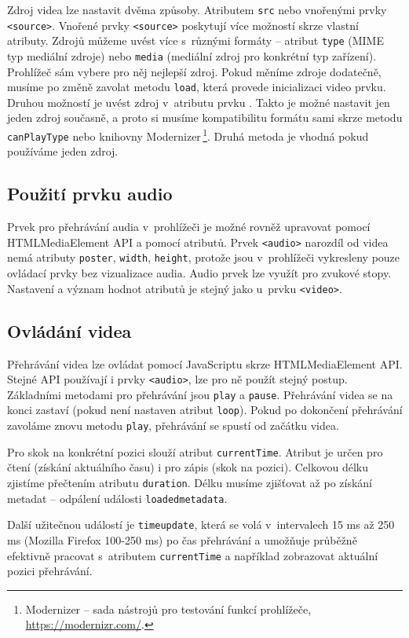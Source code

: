 Zdroj videa lze nastavit dvěma způsoby. Atributem \texttt{src} nebo vnořenými prvky \texttt{<source>}. Vnořené prvky \texttt{<source>} poskytují více možností skrze vlastní atributy. Zdrojů můžeme uvést více s~různými formáty -- atribut \texttt{type} (MIME typ mediální zdroje) nebo \texttt{media} (mediální zdroj pro konkrétní typ zařízení). Prohlížeč sám vybere pro něj nejlepší zdroj. Pokud měníme zdroje dodatečně, musíme po změně zavolat metodu \texttt{load}, která provede inicializaci video prvku. Druhou možností je uvést zdroj v~atributu  prvku . Takto je možné nastavit jen jeden zdroj současně, a proto si musíme kompatibilitu formátu sami skrze metodu \texttt{canPlayType} nebo knihovny Modernizer\,\footnote{Modernizer -- sada nástrojů pro testování funkcí prohlížeče, \url{https://modernizr.com/}.}. Druhá metoda je vhodná pokud používáme jeden zdroj.

\subsection{Použití prvku audio}
Prvek pro přehrávání audia v~prohlížeči je možné rovněž upravovat pomocí HTMLMediaElement API a pomocí atributů. Prvek \texttt{<audio>} narozdíl od videa nemá atributy \texttt{poster}, \texttt{width}, \texttt{height}, protože jsou v~prohlížeči vykresleny pouze ovládací prvky bez vizualizace audia. Audio prvek lze využít pro zvukové stopy. Nastavení a význam hodnot atributů je stejný jako u~prvku \texttt{<video>}.

\subsection{Ovládání videa}
Přehrávání videa lze ovládat pomocí JavaScriptu skrze HTMLMediaElement API. Stejné API používají i prvky \texttt{<audio>}, lze pro ně použít stejný postup. Základními metodami pro přehrávání jsou \texttt{play} a \texttt{pause}. Přehrávání videa se na konci zastaví (pokud není nastaven atribut \texttt{loop}). Pokud po dokončení přehrávání zavoláme znovu metodu \texttt{play}, přehrávání se spustí od začátku videa.

Pro skok na konkrétní pozici slouží atribut \texttt{currentTime}. Atribut je určen pro čtení (získání aktuálního času) i pro zápis (skok na pozici). Celkovou délku zjistíme přečtením atributu \texttt{duration}. Délku musíme zjišťovat až po získání metadat -- odpálení události \texttt{loadedmetadata}.

Další užitečnou událostí je \texttt{timeupdate}, která se volá v~intervalech 15 ms až 250 ms (Mozilla Firefox 100-250 ms) po čas přehrávání a umožňuje průběžně efektivně pracovat s~atributem \texttt{currentTime} a například zobrazovat aktuální pozici přehrávání.

